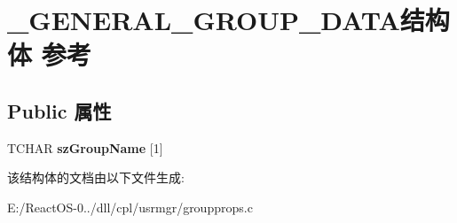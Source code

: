 \hypertarget{struct___g_e_n_e_r_a_l___g_r_o_u_p___d_a_t_a}{}\section{\+\_\+\+G\+E\+N\+E\+R\+A\+L\+\_\+\+G\+R\+O\+U\+P\+\_\+\+D\+A\+T\+A结构体 参考}
\label{struct___g_e_n_e_r_a_l___g_r_o_u_p___d_a_t_a}
\subsection*{Public 属性}
\begin{DoxyCompactItemize}
\item 
\mbox{\label{struct___g_e_n_e_r_a_l___g_r_o_u_p___d_a_t_a_a1c26d2954d0e7ed7f3dd822668c79271}} 
T\+C\+H\+AR {\bfseries sz\+Group\+Name} \mbox{[}1\mbox{]}
\end{DoxyCompactItemize}


该结构体的文档由以下文件生成\+:\begin{DoxyCompactItemize}
\item 
E\+:/\+React\+O\+S-\/0../dll/cpl/usrmgr/groupprops.\+c\end{DoxyCompactItemize}
